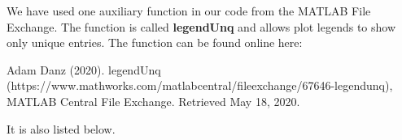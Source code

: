 We have used one auxiliary function in our code from the MATLAB File Exchange. The function is called \textbf{legendUnq} and allows plot legends to show only unique entries. The function can be found online here: 


Adam Danz (2020). legendUnq (https://www.mathworks.com/matlabcentral/fileexchange/67646-legendunq), MATLAB Central File Exchange. Retrieved May 18, 2020. 


It is also listed below.
